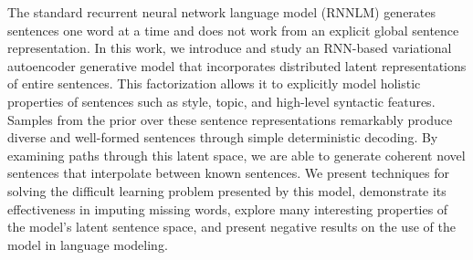 The standard recurrent neural network language model (RNNLM) generates sentences one word at a time and does not work from an explicit global sentence representation. In this work, we introduce and study an RNN-based variational autoencoder generative model that incorporates distributed latent representations of entire sentences. This factorization allows it to explicitly model holistic properties of sentences such as style, topic, and high-level syntactic features. Samples from the prior over these sentence representations remarkably produce diverse and well-formed sentences through simple deterministic decoding. By examining paths through this latent space, we are able to generate coherent novel sentences that interpolate between known sentences. We present techniques for solving the difficult learning problem presented by this model, demonstrate its effectiveness in imputing missing words, explore many interesting properties of the model's latent sentence space, and present negative results on the use of the model in language modeling.
